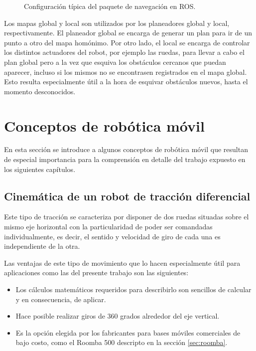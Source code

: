 \begin{figure}[ht]
    \centering
    \def\svgwidth{350pt}
    
    \caption{Configuración típica del paquete de navegación en ROS.}
    \label{fig:navigationStack}
\end{figure}

Los mapas global y local son utilizados por los planeadores global y local, respectivamente. El planeador global se encarga de generar un plan para ir de un punto a otro del mapa homónimo. Por otro lado, el local se encarga de controlar los distintos actuadores del robot, por ejemplo las ruedas, para llevar a cabo el plan global pero a la vez que esquiva los obstáculos cercanos que puedan aparecer, incluso si los mismos no se encontrasen registrados en el mapa global. Esto resulta especialmente útil a la hora de esquivar obstáculos nuevos, hasta el momento desconocidos.

\section{Conceptos de robótica móvil}

En esta sección se introduce a algunos conceptos de robótica móvil que resultan de especial importancia para la comprensión en detalle del trabajo expuesto en los siguientes capítulos.

\subsection{Cinemática de un robot de tracción diferencial}

Este tipo de tracción se caracteriza por disponer de dos ruedas situadas sobre el mismo eje horizontal con la particularidad de poder ser comandadas individualmente, es decir, el sentido y velocidad de giro de cada una es independiente de la otra.

Las ventajas de este tipo de movimiento que lo hacen especialmente útil para aplicaciones como las del presente trabajo son las siguientes:

\begin{itemize}
    \item Los cálculos matemáticos requeridos para describirlo son sencillos de calcular y en consecuencia, de aplicar.
    \item Hace posible realizar giros de 360 grados alrededor del eje vertical.
    \item Es la opción elegida por los fabricantes para bases móviles comerciales de bajo costo, como el Roomba 500 descripto en la sección \ref{sec:roomba}.
\end{itemize}

